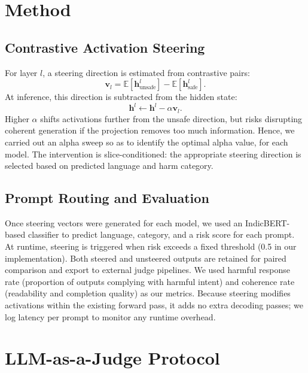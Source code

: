 \documentclass[11pt]{article}
\begin{document}
\section{Method}

\subsection{Contrastive Activation Steering}

For layer $l$, a steering direction is estimated from contrastive pairs:
\begin{equation}
\mathbf{v}_l = \mathbb{E}[\mathbf{h}^{l}_{\text{unsafe}}] - \mathbb{E}[\mathbf{h}^{l}_{\text{safe}}].
\end{equation}
At inference, this direction is subtracted from the hidden state:
\begin{equation}
\mathbf{h}^{l} \leftarrow \mathbf{h}^{l} - \alpha \mathbf{v}_l.
\end{equation}
Higher $\alpha$ shifts activations further from the unsafe direction, but risks disrupting coherent generation if the projection removes too much information. Hence, we carried out an alpha sweep so as to identify the optimal alpha value, for each model. The intervention is slice-conditioned: the appropriate steering direction is selected based on predicted language and harm category.

\subsection{Prompt Routing and Evaluation}

Once steering vectors were generated for each model, we used an IndicBERT-based classifier \citep{doddapaneni2023leavingindiclanguagebehind} to predict language, category, and a risk score for each prompt. At runtime, steering is triggered when risk exceeds a fixed threshold (0.5 in our implementation). Both steered and unsteered outputs are retained for paired comparison and export to external judge pipelines. We used harmful response rate (proportion of outputs complying with harmful intent) and coherence rate (readability and completion quality) as our metrics. Because steering modifies activations within the existing forward pass, it adds no extra decoding passes; we log latency per prompt to monitor any runtime overhead.

\section{LLM-as-a-Judge Protocol}
\end{document}
